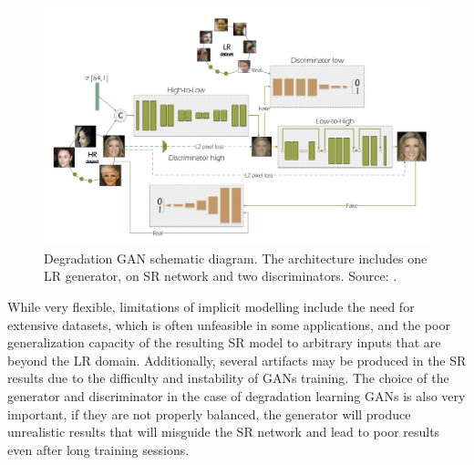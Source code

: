         \begin{figure}[H]
            \centering
            \includegraphics[width=\textwidth]{Includes/2-degradation-gan.png}
            \caption{Degradation GAN schematic diagram. The architecture includes one LR generator, on SR network and two discriminators. Source: \cite{bulat2018learn}.}    
            \label{fig:2-degradation-gan}
        \end{figure}
        
    
        While very flexible, limitations of implicit modelling include the need for extensive datasets, which is often unfeasible in some applications, and the poor generalization capacity of the resulting SR model to arbitrary inputs that are beyond the LR domain. 
        Additionally, several artifacts may be produced in the SR results due to the difficulty and instability of GANs training.
        The choice of the generator and discriminator in the case of degradation learning GANs is also very important, if they are not properly balanced, the generator will produce unrealistic results that will misguide the SR network and lead to poor results even after long training sessions.

         
\clearpage